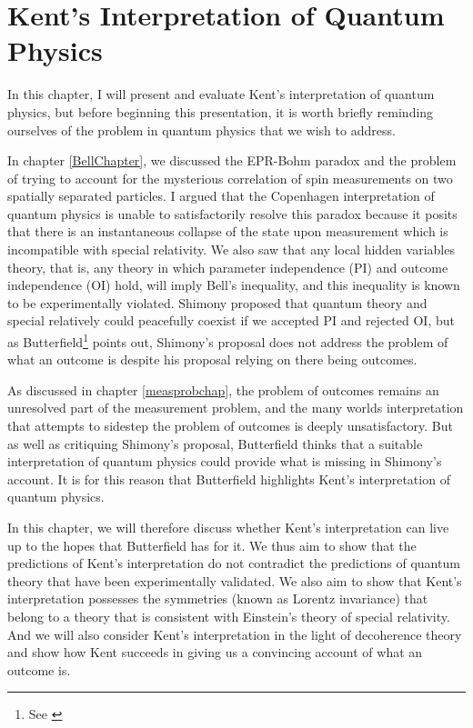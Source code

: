 \chapter{Kent's Interpretation of Quantum Physics\label{kentchapter}}
In this chapter, I will present and evaluate Kent's interpretation of quantum physics, but before beginning this presentation, it is worth briefly reminding ourselves of the problem in quantum physics that we wish to address. 

In chapter \ref{BellChapter}, we discussed the EPR-Bohm paradox and the problem of trying to account for the mysterious correlation of spin measurements on two spatially separated particles. I argued that the Copenhagen interpretation of quantum physics is unable to satisfactorily resolve this paradox because it posits that there is an instantaneous collapse of the state upon measurement which is incompatible with special relativity. We also saw that any local hidden variables theory, that is, any theory in which parameter independence (PI) and outcome independence (OI) hold, will imply Bell's inequality, and this inequality is known to be experimentally violated. Shimony proposed that quantum theory and special relatively could peacefully coexist if we accepted PI and rejected OI, but as Butterfield\footnote{See \cite{Butterfield}} points out, Shimony's proposal  does not address the problem of what an outcome is despite his proposal relying on there being outcomes. 

As discussed in chapter \ref{measprobchap}, the problem of outcomes remains an unresolved part of the measurement problem, and the many worlds interpretation that attempts to sidestep the problem of outcomes is deeply unsatisfactory. But as well as critiquing Shimony's proposal, Butterfield thinks that a suitable interpretation of quantum physics could provide what is missing in Shimony's account. It is for this reason that Butterfield highlights Kent's interpretation of quantum physics.

In this chapter, we will therefore discuss whether Kent's interpretation can live up to the hopes that Butterfield has for it. We thus aim to show that the predictions of Kent's interpretation do not contradict the  predictions of quantum theory that have been experimentally validated. We also aim to show that Kent's interpretation possesses the symmetries (known as Lorentz invariance) that belong to a theory that is consistent with Einstein's theory of special relativity. And we will also consider Kent's interpretation in the light of decoherence theory and show how Kent succeeds in giving us a convincing account of what an outcome is. 


